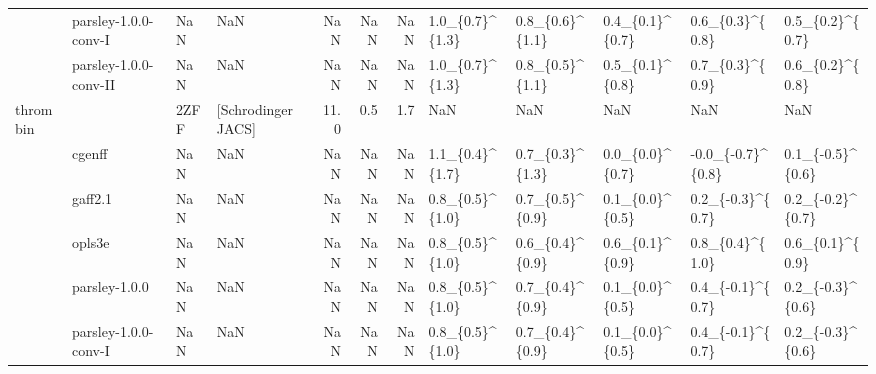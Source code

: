 \begin{tabular}{llllrrrlllll}
     & parsley-1.0.0-conv-I &         NaN &                 NaN &         NaN &      NaN &            NaN &  1.0\_\{0.7\}\textasciicircum \{1.3\} &  0.8\_\{0.6\}\textasciicircum \{1.1\} &  0.4\_\{0.1\}\textasciicircum \{0.7\} &    0.6\_\{0.3\}\textasciicircum \{0.8\} &   0.5\_\{0.2\}\textasciicircum \{0.7\} \\
     & parsley-1.0.0-conv-II &         NaN &                 NaN &         NaN &      NaN &            NaN &  1.0\_\{0.7\}\textasciicircum \{1.3\} &  0.8\_\{0.5\}\textasciicircum \{1.1\} &  0.5\_\{0.1\}\textasciicircum \{0.8\} &    0.7\_\{0.3\}\textasciicircum \{0.9\} &   0.6\_\{0.2\}\textasciicircum \{0.8\} \\
thrombin &                       &        2ZFF &  [Schrodinger JACS] &        11.0 &      0.5 &            1.7 &              NaN &              NaN &              NaN &                NaN &               NaN \\
     & cgenff &         NaN &                 NaN &         NaN &      NaN &            NaN &  1.1\_\{0.4\}\textasciicircum \{1.7\} &  0.7\_\{0.3\}\textasciicircum \{1.3\} &  0.0\_\{0.0\}\textasciicircum \{0.7\} &  -0.0\_\{-0.7\}\textasciicircum \{0.8\} &  0.1\_\{-0.5\}\textasciicircum \{0.6\} \\
     & gaff2.1 &         NaN &                 NaN &         NaN &      NaN &            NaN &  0.8\_\{0.5\}\textasciicircum \{1.0\} &  0.7\_\{0.5\}\textasciicircum \{0.9\} &  0.1\_\{0.0\}\textasciicircum \{0.5\} &   0.2\_\{-0.3\}\textasciicircum \{0.7\} &  0.2\_\{-0.2\}\textasciicircum \{0.7\} \\
     & opls3e &         NaN &                 NaN &         NaN &      NaN &            NaN &  0.8\_\{0.5\}\textasciicircum \{1.0\} &  0.6\_\{0.4\}\textasciicircum \{0.9\} &  0.6\_\{0.1\}\textasciicircum \{0.9\} &    0.8\_\{0.4\}\textasciicircum \{1.0\} &   0.6\_\{0.1\}\textasciicircum \{0.9\} \\
     & parsley-1.0.0 &         NaN &                 NaN &         NaN &      NaN &            NaN &  0.8\_\{0.5\}\textasciicircum \{1.0\} &  0.7\_\{0.4\}\textasciicircum \{0.9\} &  0.1\_\{0.0\}\textasciicircum \{0.5\} &   0.4\_\{-0.1\}\textasciicircum \{0.7\} &  0.2\_\{-0.3\}\textasciicircum \{0.6\} \\
     & parsley-1.0.0-conv-I &         NaN &                 NaN &         NaN &      NaN &            NaN &  0.8\_\{0.5\}\textasciicircum \{1.0\} &  0.7\_\{0.4\}\textasciicircum \{0.9\} &  0.1\_\{0.0\}\textasciicircum \{0.5\} &   0.4\_\{-0.1\}\textasciicircum \{0.7\} &  0.2\_\{-0.3\}\textasciicircum \{0.6\} \\

\end{tabular}
